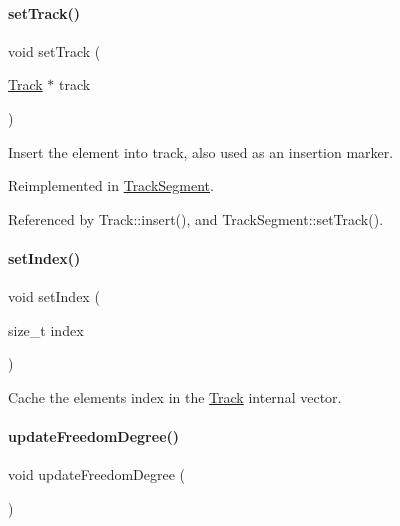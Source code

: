 \paragraph{\texorpdfstring{set\+Track()}{setTrack()}}
{\footnotesize\ttfamily void set\+Track (\begin{DoxyParamCaption}\item[{\hyperlink{classKite_1_1Track}{Track} $\ast$}]{track }\end{DoxyParamCaption})\hspace{0.3cm}{\ttfamily [virtual]}}

Insert the element into {\ttfamily track}, also used as an insertion marker. 

Reimplemented in \hyperlink{classKite_1_1TrackSegment_abd3d8093f871d3d1a7f24b053648026c}{Track\+Segment}.



Referenced by Track\+::insert(), and Track\+Segment\+::set\+Track().

\mbox{\label{classKite_1_1TrackElement_abee236b4d62f51320212f31e010fc1b5}} 
\paragraph{\texorpdfstring{set\+Index()}{setIndex()}}
{\footnotesize\ttfamily void set\+Index (\begin{DoxyParamCaption}\item[{size\+\_\+t}]{index }\end{DoxyParamCaption})\hspace{0.3cm}{\ttfamily [inline]}}

Cache the element\textquotesingle{}s index in the \hyperlink{classKite_1_1Track}{Track} internal vector. \mbox{\label{classKite_1_1TrackElement_af5332d647c0482aa90ad7cc9b2a50f3a}} 
\paragraph{\texorpdfstring{update\+Freedom\+Degree()}{updateFreedomDegree()}}
{\footnotesize\ttfamily void update\+Freedom\+Degree (\begin{DoxyParamCaption}{ }\end{DoxyParamCaption})\hspace{0.3cm}{\ttfamily [virtual]}}

